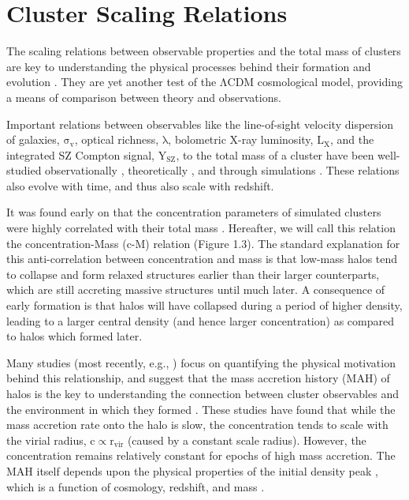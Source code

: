 \section{Cluster Scaling Relations}
The scaling relations between observable properties and the total mass of clusters are key to understanding the physical processes behind their formation and evolution \citep{VI09.1,GI13.1}. They are yet another test of the $\mathrm{\Lambda CDM}$ cosmological model, providing a means of comparison between theory and observations.

Important relations between observables like the line-of-sight velocity dispersion of galaxies, $\mathrm{\sigma_{v}}$, optical richness, $\mathrm{\lambda}$, bolometric X-ray luminosity, $\mathrm{L_{X}}$, and the integrated SZ Compton signal, $\mathrm{Y_{SZ}}$, to the total mass of a cluster have been well-studied observationally \citep{SE15.3}, theoretically \citep{GI13.1}, and through simulations \citep{ST10.1}. These relations also evolve with time, and thus also scale with redshift.

It was found early on that the concentration parameters of simulated clusters were highly correlated with their total mass \citep{NFW1996,BullockEtAl2001}. Hereafter, we will call this relation the concentration-Mass (c-M) relation (Figure 1.3). The standard explanation for this anti-correlation between concentration and mass is that low-mass halos tend to collapse and form relaxed structures earlier than their larger counterparts, which are still accreting massive structures until much later. A consequence of early formation is that halos will have collapsed during a period of higher density, leading to a larger central density (and hence larger concentration) as compared to halos which formed later.

Many studies (most recently, e.g., \citealt{CO15.2}) focus on quantifying the physical motivation behind this relationship, and suggest that the mass accretion history (MAH) of halos is the key to understanding the connection between cluster observables and the environment in which they formed \citep{BU01.1,WE02.1,ZH03.1}. These studies have found that while the mass accretion rate onto the halo is slow, the concentration tends to scale with the virial radius, $\mathrm{c\propto r_{vir}}$ (caused by a constant scale radius). However, the concentration remains relatively constant for epochs of high mass accretion. The MAH itself depends upon the physical properties of the initial density peak \citep{DA08.1}, which is a function of cosmology, redshift, and
mass \citep{DI15.1}.


